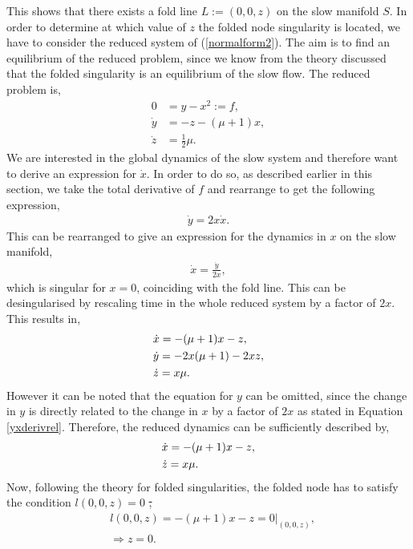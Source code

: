 This shows that there exists a fold line $L:=(0,0,z)$ on the slow manifold $S$.
In order to determine at which value of $z$ the folded node singularity is located, we have to consider the reduced system of (\ref{normalform2}). The aim is to find an equilibrium of the reduced problem, since we know from the theory discussed that the folded singularity is an equilibrium of the slow flow.
The reduced problem is,
\begin{align}\label{normalform2red}
0 &= y - x^2 :=f,\\
\dot{y} &=- z -(\mu +1)x, \\
\dot{z} &=\frac{1}{2} \mu.
\end{align}
We are interested in the global dynamics of the slow system and therefore want to derive an expression for $\dot{x}$. In order to do so, as described earlier in this section, we take the total derivative of $f$ and rearrange to get the following expression,
\begin{align} \label{yxderivrel}
\dot{y} = 2x \dot{x}.
\end{align}
 This can be rearranged to give an expression for the dynamics in $x$ on the slow manifold,
\begin{align*}
\dot{x}= \frac{\dot{y}}{2x},
\end{align*}
which is singular for $x=0$, coinciding with the fold line.
This can be desingularised by rescaling time in the whole reduced system by a factor of $2x$. This results in,
\begin{align} \label{fullredsysformmo}
&\dot{x} = -(\mu+1)x - z, \notag \\
&\dot{y} = - 2x (\mu +1) -2xz,\\
&\dot{z} = x \mu \notag.
\end{align}
However it can be noted that the equation for $y$ can be omitted, since the change in $y$ is directly related to the change in $x$ by a factor of $2x$ as stated in Equation \ref{yxderivrel}. Therefore, the reduced dynamics can be sufficiently described by,
\begin{align}\label{twovarxzred}
&\dot{x} = -(\mu+1)x - z,\\
&\dot{z} = x \mu. \notag
\end{align}
Now, following the theory for folded singularities, the folded node has to satisfy the condition $l(0,0,z)=0$ \st,
\begin{align*}
&l(0,0,z)= -(\mu+1)x - z=0 |_{(0,0,z)},\\
&\Rightarrow z=0.
\end{align*}
